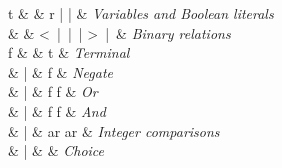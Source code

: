 \begin{syntax}
  t & \Coloneqq{} & r \quad|\quad \tru{} \quad|\quad \fls{}
  & \textit{Variables and Boolean literals} \\
  [1.5ex]
  \otimes & \Coloneqq{} & < \,\;|\;\; \leq \;\:\,|\;\; \geq \,\;|\;\;  > \,\;|\  \equiv & \emph{Binary relations}\\
  [1.5ex]


  f & \Coloneqq{} & t    & \textit{Terminal} \\
  & | & \neg{} f       & \textit{Negate} \\
  & | & f \vee{} f     & \textit{Or} \\
  & | & f \wedge{} f   & \textit{And} \\
  & | & ar \otimes{} ar  & \emph{Integer comparisons} \\
  & | &  & \textit{Choice} \\
\end{syntax}
